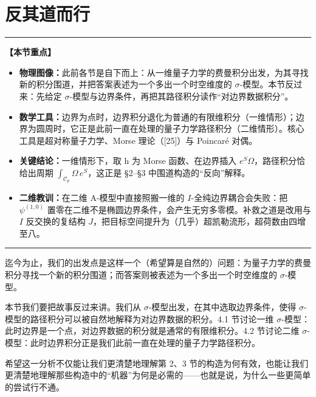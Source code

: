 \documentclass[11pt,a4paper,UTF8]{ctexart}
\theoremstyle{plain}
\theoremstyle{definition}
\newenvironment{keypoints}{%
  \par\addvspace{0.9em}%
  \noindent\begin{minipage}{\linewidth}%
  \color{black!80}\rule{\linewidth}{0.6pt}\par\vspace{2pt}%
  \noindent\textbf{【本节重点】}\par\vspace{2pt}%
  \begin{itemize}[leftmargin=1.6em,itemsep=1pt,topsep=2pt,parsep=0pt]%
}{%
  \end{itemize}\vspace{1pt}\noindent\color{black!80}\rule{\linewidth}{0.6pt}%
  \end{minipage}\par\addvspace{0.9em}%
}
\begin{document}


\section{反其道而行}

\begin{keypoints}
    \item \textbf{物理图像：}此前各节是自下而上：从一维量子力学的费曼积分出发，为其寻找新的积分围道，并把答案表述为一个多出一个时空维度的 $\sigma$-模型。本节反过来：先给定 $\sigma$-模型与边界条件，再把其路径积分读作“对边界数据积分”。
    \item \textbf{数学工具：}边界为点时，边界积分退化为普通的有限维积分（一维情形）；边界为圆周时，它正是此前一直在处理的量子力学路径积分（二维情形）。核心工具是超对称量子力学、Morse 理论（[25]）与 Poincaré 对偶。
    \item \textbf{关键结论：}一维情形下，取 h 为 Morse 函数、在边界插入 $e^{S}\Omega$，路径积分恰给出周期 $\int_{\mathcal{C}_p}\Omega\,e^{S}$，这正是 §2–§3 中围道构造的“反向”解释。
    \item \textbf{二维教训：}在二维 A-模型中直接照搬一维的 $I$-全纯边界耦合会失败：把 $\psi^{(1,0)}$ 置零在二维不是椭圆边界条件，会产生无穷多零模。补救之道是改用与 $I$ 反交换的复结构 $J$，把目标空间提升为（几乎）超凯勒流形，超荷数由四增至八。
\end{keypoints}

迄今为止，我们的出发点是这样一个（希望算是自然的）问题：为量子力学的费曼积分寻找一个新的积分围道；而答案则被表述为一个多出一个时空维度的 $\sigma$-模型。

本节我们要把故事反过来讲。我们从 $\sigma$-模型出发，在其中选取边界条件，使得 $\sigma$-模型的路径积分可以被自然地解释为对边界数据的积分。4.1 节讨论一维 $\sigma$-模型：此时边界是一个点，对边界数据的积分就是通常的有限维积分。4.2 节讨论二维 $\sigma$-模型：此时边界积分正是我们此前一直在处理的量子力学路径积分。

希望这一分析不仅能让我们更清楚地理解第 2、3 节的构造为何有效，也能让我们更清楚地理解那些构造中的“机器”为何是必需的——也就是说，为什么一些更简单的尝试行不通。

\end{document}

